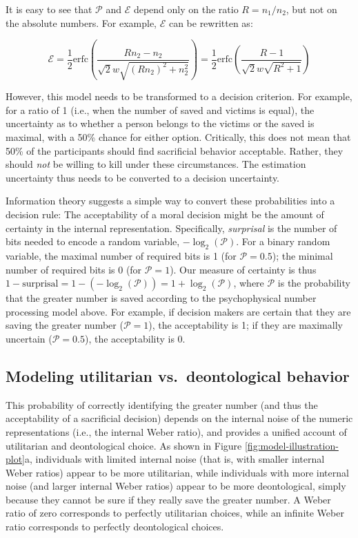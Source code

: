\documentclass[
]{article}
\begin{document}
It is easy to see that \(\mathcal{P}\) and \(\mathcal{E}\) depend only on the ratio \(R = n_1/n_2\), but not on the absolute numbers. For example, \(\mathcal{E}\) can be rewritten as:

\[\mathcal{E} = \frac{1}{2} \text{erfc}\left(\frac{Rn_2 - n_2}{\sqrt{2}w\sqrt{(Rn_2)^2 + n_2^2}}\right) = \frac{1}{2} \text{erfc}\left(\frac{R - 1}{\sqrt{2}w\sqrt{R^2 + 1}}\right)\]

However, this model needs to be transformed to a decision criterion. For example, for a ratio of 1 (i.e., when the number of saved and victims is equal), the uncertainty as to whether a person belongs to the victims or the saved is maximal, with a 50\% chance for either option. Critically, this does not mean that 50\% of the participants should find sacrificial behavior acceptable. Rather, they should \emph{not} be willing to kill under these circumstances. The estimation uncertainty thus needs to be converted to a decision uncertainty.

Information theory suggests a simple way to convert these probabilities into a decision rule: The acceptability of a moral decision might be the amount of certainty in the internal representation. Specifically, \emph{surprisal} is the number of bits needed to encode a random variable, \(-\log_2(\mathcal{P})\). For a binary random variable, the maximal number of required bits is 1 (for \(\mathcal{P} = 0.5\)); the minimal number of required bits is 0 (for \(\mathcal{P} = 1\)). Our measure of certainty is thus \(1 - \text{surprisal} = 1 - (-\log_2(\mathcal{P})) = 1 + \log_2(\mathcal{P})\), where \(\mathcal{P}\) is the probability that the greater number is saved according to the psychophysical number processing model above. For example, if decision makers are certain that they are saving the greater number (\(\mathcal{P} = 1\)), the acceptability is 1; if they are maximally uncertain (\(\mathcal{P} = 0.5\)), the acceptability is 0.

\subsection{Modeling utilitarian vs.~deontological behavior}\label{modeling-utilitarian-vs.-deontological-behavior}

This probability of correctly identifying the greater number (and thus the acceptability of a sacrificial decision) depends on the internal noise of the numeric representations (i.e., the internal Weber ratio), and provides a unified account of utilitarian and deontological choice. As shown in Figure \ref{fig:model-illustration-plot}a, individuals with limited internal noise (that is, with smaller internal Weber ratios) appear to be more utilitarian, while individuals with more internal noise (and larger internal Weber ratios) appear to be more deontological, simply because they cannot be sure if they really save the greater number. A Weber ratio of zero corresponds to perfectly utilitarian choices, while an infinite Weber ratio corresponds to perfectly deontological choices.
\end{document}
